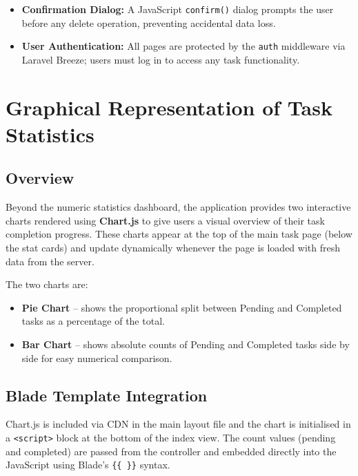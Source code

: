 \documentclass[12pt,a4paper]{report}
\begin{document}
\begin{titlepage}
\begin{itemize}[leftmargin=1.5cm]
    \item \textbf{Confirmation Dialog:} A JavaScript \texttt{confirm()} dialog prompts
    the user before any delete operation, preventing accidental data loss.

    \item \textbf{User Authentication:} All pages are protected by the \texttt{auth}
    middleware via Laravel Breeze; users must log in to access any task functionality.
\end{itemize}

\chapter{Graphical Representation of Task Statistics}

\section{Overview}

Beyond the numeric statistics dashboard, the application provides two interactive
charts rendered using \textbf{Chart.js} to give users a visual overview of their
task completion progress. These charts appear at the top of the main task page
(below the stat cards) and update dynamically whenever the page is loaded with
fresh data from the server.

The two charts are:
\begin{itemize}[leftmargin=1.5cm]
    \item \textbf{Pie Chart} -- shows the proportional split between Pending and
    Completed tasks as a percentage of the total.
    \item \textbf{Bar Chart} -- shows absolute counts of Pending and Completed tasks
    side by side for easy numerical comparison.
\end{itemize}

\section{Blade Template Integration}

Chart.js is included via CDN in the main layout file and the chart is initialised
in a \texttt{<script>} block at the bottom of the index view. The count values
(pending and completed) are passed from the controller and embedded directly into
the JavaScript using Blade's \texttt{\{\{ \}\}} syntax.


\end{titlepage}
\end{document}
